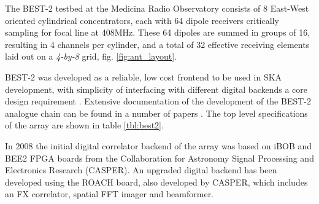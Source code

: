 \documentclass[useAMS,macros,usenatbib,onecolumn]{mn2e}
\begin{document}
The BEST-2 testbed at the Medicina Radio Observatory consists of 8 East-West oriented cylindrical concentrators, each with 64 dipole receivers critically sampling for focal line at 408MHz.
These 64 dipoles are summed in groups of 16, resulting in 4 channels per cylinder, and a total of 32 effective receiving elements laid out on a \emph{4-by-8} grid, fig. \ref{fig:ant_layout}.

BEST-2 was developed as a reliable, low cost frontend to be used in SKA development, with simplicity of interfacing with different digital backends a core design requirement \citep{best2}.
Extensive documentation of the development of the BEST-2 analogue chain can be found in a number of papers \citep{best2-lna} \citep{best2-rec}. The top level specifications of the array are shown in table \ref{tbl:best2}.


In 2008 the initial digital correlator backend of the array was based on iBOB and BEE2 FPGA boards from the Collaboration for Astronomy Signal Processing and Electronics Research (CASPER)\citep{best2-casper}.
An upgraded digital backend has been developed using the ROACH board, also developed by CASPER, which includes an FX correlator, spatial FFT imager and beamformer.
\end{document}
